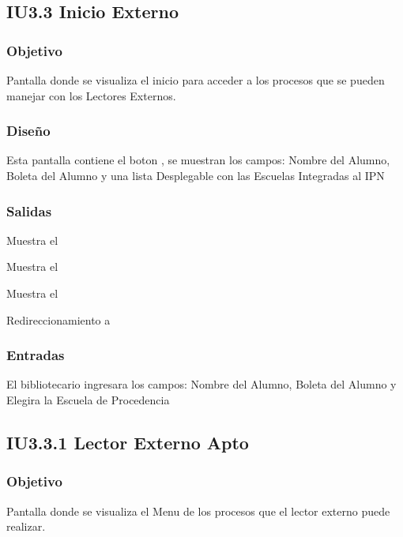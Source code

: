 \newpage
\subsection{IU3.3 Inicio Externo}

\subsubsection{Objetivo}
	Pantalla donde se visualiza el inicio para acceder a los procesos que se pueden manejar con los Lectores Externos. 

\subsubsection{Diseño}
	Esta pantalla contiene el boton , se muestran los campos: Nombre del Alumno, Boleta del Alumno y una lista Desplegable con las Escuelas Integradas al IPN


\subsubsection{Salidas}
	\begin{Citemize}
		\item Muestra el 
		\item Muestra el 
		\item Muestra el 
		\item Redireccionamiento a 
	\end{Citemize}
	
\subsubsection{Entradas}
	\begin{Citemize}
		\item El bibliotecario ingresara los campos: Nombre del Alumno, Boleta del Alumno y Elegira la Escuela de Procedencia
	\end{Citemize}
	
\newpage
\subsection{IU3.3.1 Lector Externo Apto}

\subsubsection{Objetivo}
	Pantalla donde se visualiza el Menu de los procesos que el lector externo puede realizar. 

